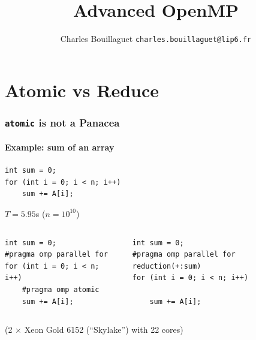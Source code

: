 \documentclass[xcolor={x11names,svgnames},x11names,svgnames]{beamer}
\author[C.~Bouillaguet]{Charles Bouillaguet \newline
  {\small \texttt{charles.bouillaguet@lip6.fr}}}
\title{Advanced OpenMP}
\begin{document}
\begin{frame}
  \titlepage
\end{frame}


\section{Atomic vs Reduce}

\begin{frame}[fragile]
  \frametitle{\texttt{atomic} is not a Panacea}
  \framesubtitle{Example: sum of an array}

\begin{verbatim}
int sum = 0;
for (int i = 0; i < n; i++)
    sum += A[i];
\end{verbatim}

      \bigskip
      
      \Large \alert{$T = 5.95$s} \qquad ($n = 10^{10}$)


      \vspace{1cm}
      
  \begin{columns}
    \begin{column}{0.4\textwidth}
\begin{verbatim}
int sum = 0;
#pragma omp parallel for
for (int i = 0; i < n; i++)
    #pragma omp atomic
    sum += A[i];
\end{verbatim}

      \bigskip
      
      
    \end{column}
    \begin{column}{0.6\textwidth}
\begin{verbatim}
int sum = 0;
#pragma omp parallel for reduction(+:sum)
for (int i = 0; i < n; i++)

    sum += A[i];
\end{verbatim}

      \bigskip
      
    \end{column}
  \end{columns}

\vspace{1cm}
  
\normalsize (2 $\times$ Xeon Gold 6152 (``Skylake'') with 22 cores)
\end{frame}

\end{document}
